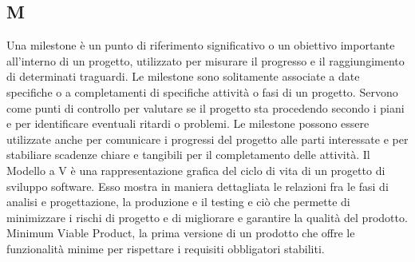 \begin{center}
\section*{M}
\end{center}
Una milestone è un punto di riferimento significativo o un obiettivo importante all'interno di un progetto, utilizzato per misurare il progresso e il raggiungimento di determinati traguardi. Le milestone sono solitamente associate a date specifiche o a completamenti di specifiche attività o fasi di un progetto. Servono come punti di controllo per valutare se il progetto sta procedendo secondo i piani e per identificare eventuali ritardi o problemi. Le milestone possono essere utilizzate anche per comunicare i progressi del progetto alle parti interessate e per stabiliare scadenze chiare e tangibili per il completamento delle attività.
Il Modello a V è una rappresentazione grafica del ciclo di vita di un progetto di sviluppo software. Esso mostra in maniera dettagliata le relazioni fra le fasi di analisi e progettazione, la produzione e il testing e ciò che permette di minimizzare i rischi di progetto e di migliorare e garantire la qualità del prodotto.
Minimum Viable Product, la prima versione di un prodotto che offre le funzionalità minime per rispettare i requisiti obbligatori stabiliti.
